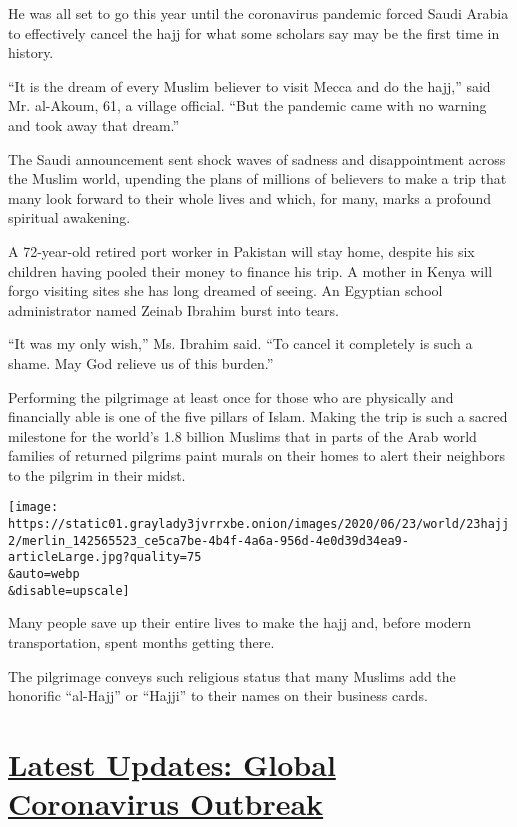 He was all set to go this year until the coronavirus pandemic forced
Saudi Arabia to effectively cancel the hajj for what some scholars say
may be the first time in history.

``It is the dream of every Muslim believer to visit Mecca and do the
hajj,'' said Mr. al-Akoum, 61, a village official. ``But the pandemic
came with no warning and took away that dream.''

The Saudi announcement sent shock waves of sadness and disappointment
across the Muslim world, upending the plans of millions of believers to
make a trip that many look forward to their whole lives and which, for
many, marks a profound spiritual awakening.

A 72-year-old retired port worker in Pakistan will stay home, despite
his six children having pooled their money to finance his trip. A mother
in Kenya will forgo visiting sites she has long dreamed of seeing. An
Egyptian school administrator named Zeinab Ibrahim burst into tears.

``It was my only wish,'' Ms. Ibrahim said. ``To cancel it completely is
such a shame. May God relieve us of this burden.''

Performing the pilgrimage at least once for those who are physically and
financially able is one of the five pillars of Islam. Making the trip is
such a sacred milestone for the world's 1.8 billion Muslims that in
parts of the Arab world families of returned pilgrims paint murals on
their homes to alert their neighbors to the pilgrim in their midst.

\texttt{[image: https://static01.graylady3jvrrxbe.onion/images/2020/06/23/world/23hajj2/merlin\_142565523\_ce5ca7be-4b4f-4a6a-956d-4e0d39d34ea9-articleLarge.jpg?quality=75\\\&auto=webp\\\&disable=upscale]}

Many people save up their entire lives to make the hajj and, before
modern transportation, spent months getting there.

The pilgrimage conveys such religious status that many Muslims add the
honorific ``al-Hajj'' or ``Hajji'' to their names on their business
cards.

\hypertarget{latest-updates-global-coronavirus-outbreak}{%
\section{\texorpdfstring{\href{https://www.nytimes3xbfgragh.onion/2020/08/04/world/coronavirus-cases.html?action=click\&pgtype=Article\&state=default\&region=MAIN_CONTENT_1\&context=storylines_live_updates}{Latest
Updates: Global Coronavirus
Outbreak}}{Latest Updates: Global Coronavirus Outbreak}}\label{latest-updates-global-coronavirus-outbreak}}

